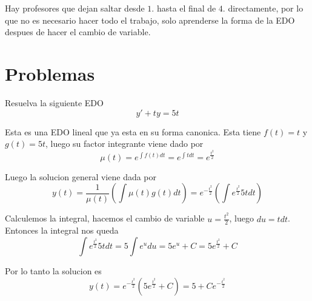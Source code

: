 \documentclass[a4paper,oneside,10.5pt]{article}
\begin{document}
\begin{obs}
 Hay profesores que dejan saltar desde $1.$ hasta el final de $4.$ directamente, por lo que no es necesario hacer todo el trabajo, solo aprenderse la forma de la EDO despues de hacer el cambio de variable.
\end{obs}

\begin{ejemplo}

\end{ejemplo}

\section*{Problemas}
\begin{prob}
  Resuelva la siguiente EDO
  \begin{equation*}
    y' + ty = 5t
  \end{equation*}
\end{prob}
\begin{sol}
  Esta es una EDO lineal que ya esta en su forma canonica. Esta tiene $f(t) = t$ y $g(t) = 5t$, luego su factor integrante viene dado por
  \begin{equation*}
    \mu(t) = e^{\int f(t) dt} = e^{\int t dt} = e^{\frac{t^{2}}{2}}
  \end{equation*}

  Luego la solucion general viene dada por
  \begin{equation*}
    y(t) = \frac{1}{\mu(t)}(\int \mu(t) g(t) dt) = e^{-\frac{t^{2}}{2}} (\int e^{\frac{t^{2}}{2}} 5t dt)
  \end{equation*}

  Calculemos la integral, hacemos el cambio de variable $u = \frac{t^{2}}{2}$, luego $du = t dt$.
  Entonces la integral nos queda
  \begin{equation*}
    \int e^{\frac{t^{2}}{2}} 5t dt = 5 \int e^{u} du = 5e^{u} + C= 5e^{\frac{t^{2}}{2}} + C
  \end{equation*}

  Por lo tanto la solucion es
  \begin{equation*}
    y(t) = e^{-\frac{t^{2}}{2}}(5e^{\frac{t^{2}}{2}} + C) = 5 + Ce^{-\frac{t^{2}}{2}}
  \end{equation*}
\end{sol}
\end{document}
